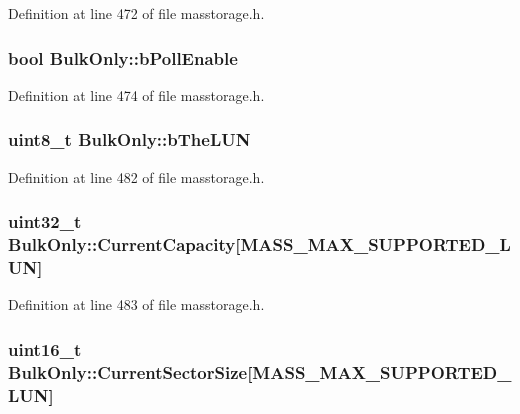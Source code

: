 \-Definition at line 472 of file masstorage.\-h.

\hypertarget{class_bulk_only_a21961ad1130480f534ef3e91f24c56a0}{
\subsubsection[{b\-Poll\-Enable}]{\setlength{\rightskip}{0pt plus 5cm}bool {\bf \-Bulk\-Only\-::b\-Poll\-Enable}}}\label{class_bulk_only_a21961ad1130480f534ef3e91f24c56a0}


\-Definition at line 474 of file masstorage.\-h.

\hypertarget{class_bulk_only_a24c051d401f5f1a9ce65c1bc25ab02dd}{
\subsubsection[{b\-The\-L\-U\-N}]{\setlength{\rightskip}{0pt plus 5cm}uint8\-\_\-t {\bf \-Bulk\-Only\-::b\-The\-L\-U\-N}}}\label{class_bulk_only_a24c051d401f5f1a9ce65c1bc25ab02dd}


\-Definition at line 482 of file masstorage.\-h.

\hypertarget{class_bulk_only_a73c3f6b8f6f79ad60e5ba05e560b277d}{
\subsubsection[{\-Current\-Capacity}]{\setlength{\rightskip}{0pt plus 5cm}uint32\-\_\-t {\bf \-Bulk\-Only\-::\-Current\-Capacity}\mbox{[}\-M\-A\-S\-S\-\_\-\-M\-A\-X\-\_\-\-S\-U\-P\-P\-O\-R\-T\-E\-D\-\_\-\-L\-U\-N\mbox{]}}}\label{class_bulk_only_a73c3f6b8f6f79ad60e5ba05e560b277d}


\-Definition at line 483 of file masstorage.\-h.

\hypertarget{class_bulk_only_aa4e2711c6279d48c63e82a63ad458421}{
\subsubsection[{\-Current\-Sector\-Size}]{\setlength{\rightskip}{0pt plus 5cm}uint16\-\_\-t {\bf \-Bulk\-Only\-::\-Current\-Sector\-Size}\mbox{[}\-M\-A\-S\-S\-\_\-\-M\-A\-X\-\_\-\-S\-U\-P\-P\-O\-R\-T\-E\-D\-\_\-\-L\-U\-N\mbox{]}}}\label{class_bulk_only_aa4e2711c6279d48c63e82a63ad458421}


